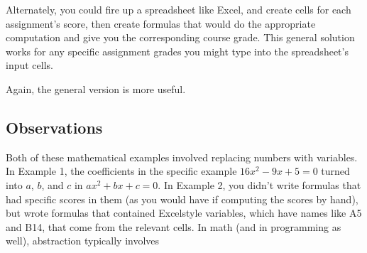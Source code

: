 \documentclass[letterpaper,10pt,english]{jupyterBook}
\begin{document}
\sphinxAtStartPar
Alternately, you could fire up a spreadsheet like Excel, and create cells for each assignment’s score, then create formulas that would do the appropriate computation and give you the corresponding course grade.  This general solution works for any specific assignment grades you might type into the spreadsheet’s input cells.

\sphinxAtStartPar
Again, the general version is more useful.


\subsection{Observations}
\label{\detokenize{chapter-7-abstraction:observations}}
\sphinxAtStartPar
Both of these mathematical examples involved replacing numbers with variables.  In Example 1, the coefficients in the specific example \(16x^2-9x+5=0\) turned into \(a\), \(b\), and \(c\) in \(ax^2+bx+c=0\).  In Example 2, you didn’t write formulas that had specific scores in them (as you would have if computing the scores by hand), but wrote formulas that contained Excel\sphinxhyphen{}style variables, which have names like A5 and B14, that come from the relevant cells.  In math (and in programming as well), abstraction typically involves 
\end{document}
